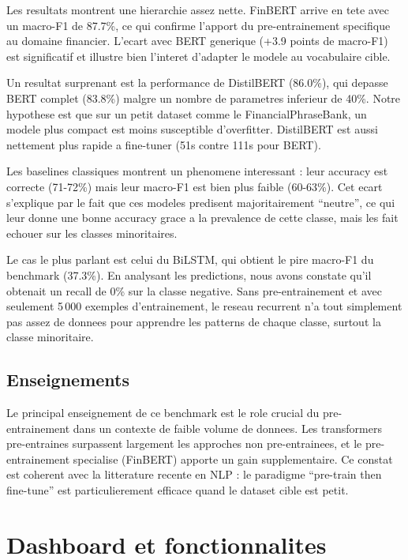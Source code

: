 \documentclass[12pt, a4paper]{article}
\begin{document}
Les resultats montrent une hierarchie assez nette. FinBERT arrive en tete avec un
macro-F1 de 87.7\%, ce qui confirme l'apport du pre-entrainement specifique au
domaine financier. L'ecart avec BERT generique (+3.9 points de macro-F1) est
significatif et illustre bien l'interet d'adapter le modele au vocabulaire cible.

Un resultat surprenant est la performance de DistilBERT (86.0\%), qui depasse BERT
complet (83.8\%) malgre un nombre de parametres inferieur de 40\%. Notre hypothese
est que sur un petit dataset comme le FinancialPhraseBank, un modele plus compact
est moins susceptible d'overfitter. DistilBERT est aussi nettement plus rapide a
fine-tuner (51s contre 111s pour BERT).

Les baselines classiques montrent un phenomene interessant : leur accuracy est
correcte (71-72\%) mais leur macro-F1 est bien plus faible (60-63\%). Cet ecart
s'explique par le fait que ces modeles predisent majoritairement ``neutre'', ce qui
leur donne une bonne accuracy grace a la prevalence de cette classe, mais les fait
echouer sur les classes minoritaires.

Le cas le plus parlant est celui du BiLSTM, qui obtient le pire macro-F1 du benchmark
(37.3\%). En analysant les predictions, nous avons constate qu'il obtenait un recall
de 0\% sur la classe negative. Sans pre-entrainement et avec seulement 5\,000
exemples d'entrainement, le reseau recurrent n'a tout simplement pas assez de
donnees pour apprendre les patterns de chaque classe, surtout la classe minoritaire.

\subsection{Enseignements}

Le principal enseignement de ce benchmark est le role crucial du pre-entrainement
dans un contexte de faible volume de donnees. Les transformers pre-entraines
surpassent largement les approches non pre-entrainees, et le pre-entrainement
specialise (FinBERT) apporte un gain supplementaire. Ce constat est coherent avec
la litterature recente en NLP : le paradigme ``pre-train then fine-tune'' est
particulierement efficace quand le dataset cible est petit.

\section{Dashboard et fonctionnalites}
\end{document}
